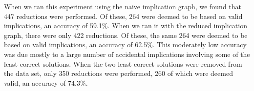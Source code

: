 \documentclass[11pt,twoside]{article}
\theoremstyle{definition}
\begin{document}

When we ran this experiment using the naive implication graph, we found that 447 reductions were performed. Of these, 264 were deemed to be based on valid implications, an accuracy of 59.1\%. When we ran it with the reduced implication graph, there were only 422 reductions. Of these, the same 264 were deemed to be based on valid implications, an accuracy of 62.5\%. This moderately low accuracy was due mostly to a large number of accidental implications involving some of the least correct solutions. When the two least correct solutions were removed from the data set, only 350 reductions were performed, 260 of which were deemed valid, an accuracy of 74.3\%.

\end{document}
